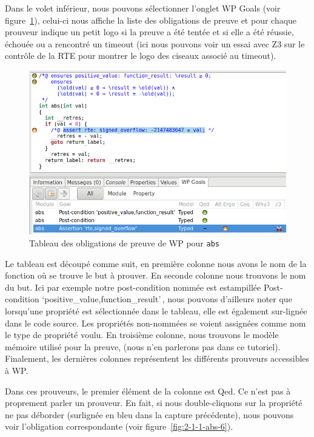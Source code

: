 \documentclass[12pt,francais,]{scrbook}
\begin{document}
Dans le volet inférieur, nous pouvons sélectionner l'onglet \og{}WP
Goals\fg{} (voir figure~\ref{fig:2-1-1-abs-5}), celui-ci nous affiche la
liste des obligations de preuve et
pour chaque prouveur indique un petit logo si la preuve a été tentée et
si elle a été réussie, échouée ou a rencontré un timeout (ici nous
pouvons voir un essai avec Z3 sur le contrôle de la RTE pour montrer le
logo des ciseaux associé au timeout).

\begin{figure}[htbp]
\centering
\includegraphics[scale=0.5]{2-1-1-abs-5.png}
\caption{Tableau des obligations de preuve de WP pour \texttt{abs}}
\label{fig:2-1-1-abs-5}
\end{figure}

Le tableau est découpé comme suit, en première colonne nous avons le nom
de la fonction où se trouve le but à prouver. En seconde colonne nous
trouvons le nom du but. Ici par exemple notre post-condition nommée est
estampillée \og{}Post-condition `positive\_value,function\_result'\,\fg{},
nous pouvons d'ailleurs noter que lorsqu'une propriété est sélectionnée
dans le tableau, elle est également sur-lignée dans le code source. Les
propriétés non-nommées se voient assignées comme nom le type de
propriété voulu. En troisième colonne, nous trouvons le modèle mémoire
utilisé pour la preuve, (nous n'en parlerons pas dans ce tutoriel).
Finalement, les dernières colonnes représentent les différents prouveurs
accessibles à WP.

Dans ces prouveurs, le premier élément de la colonne est Qed. Ce n'est
pas à proprement parler un prouveur. En fait, si nous double-cliquons
sur la propriété \og{}ne pas déborder\fg{} (surlignée en bleu dans la capture
précédente), nous pouvons voir l'obligation correspondante (voir
figure~\ref{fig:2-1-1-abs-6}).
\end{document}
